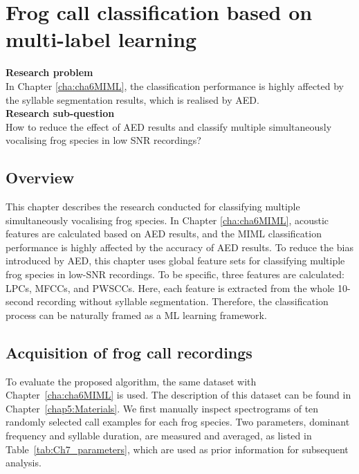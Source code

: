 
\chapter{Frog call classification based on multi-label learning}
\label{cha:cha7ML}
\textbf{Research problem}
\\
In Chapter \ref{cha:cha6MIML}, the classification performance is highly affected by the syllable segmentation results, which is realised by AED. 
\\
\textbf{Research sub-question}
\\
How to reduce the effect of AED results and classify multiple simultaneously vocalising frog species in low SNR recordings?


\section{Overview}
\label{sect:introduction}

This chapter describes the research conducted for classifying multiple simultaneously vocalising frog species. In Chapter \ref{cha:cha6MIML}, acoustic features are calculated based on AED results, and the MIML classification performance is highly affected by the accuracy of AED results. To reduce the bias introduced by AED, this chapter uses global feature sets for classifying multiple frog species in low-SNR recordings.
To be specific, three features are calculated: LPCs, MFCCs, and PWSCCs. Here, each feature is extracted from the whole 10-second recording without  syllable segmentation. Therefore, the classification process can be naturally framed as a ML learning framework.  



  

\section{Acquisition of frog call recordings}

To evaluate the proposed algorithm, the same dataset with Chapter~\ref{cha:cha6MIML} is used. The description of this dataset can be found in Chapter~\ref{chap5:Materials}. We first manually inspect spectrograms of ten randomly selected call examples for each frog species. Two parameters, dominant frequency and syllable duration, are measured and averaged, as listed in Table~\ref{tab:Ch7_parameters}, which are used as prior information for subsequent analysis.

